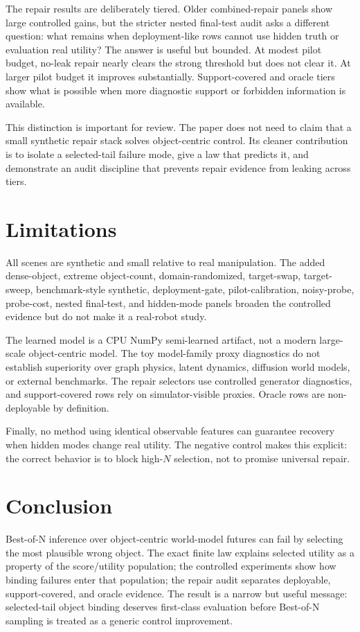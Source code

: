 \documentclass[10pt]{article}
\begin{document}
The repair results are deliberately tiered. Older combined-repair panels show large controlled gains, but the stricter nested final-test audit asks a different question: what remains when deployment-like rows cannot use hidden truth or evaluation real utility? The answer is useful but bounded. At modest pilot budget, no-leak repair nearly clears the strong threshold but does not clear it. At larger pilot budget it improves substantially. Support-covered and oracle tiers show what is possible when more diagnostic support or forbidden information is available.

This distinction is important for review. The paper does not need to claim that a small synthetic repair stack solves object-centric control. Its cleaner contribution is to isolate a selected-tail failure mode, give a law that predicts it, and demonstrate an audit discipline that prevents repair evidence from leaking across tiers.

\section{Limitations}

All scenes are synthetic and small relative to real manipulation. The added dense-object, extreme object-count, domain-randomized, target-swap, target-sweep, benchmark-style synthetic, deployment-gate, pilot-calibration, noisy-probe, probe-cost, nested final-test, and hidden-mode panels broaden the controlled evidence but do not make it a real-robot study.

The learned model is a CPU NumPy semi-learned artifact, not a modern large-scale object-centric model. The toy model-family proxy diagnostics do not establish superiority over graph physics, latent dynamics, diffusion world models, or external benchmarks. The repair selectors use controlled generator diagnostics, and support-covered rows rely on simulator-visible proxies. Oracle rows are non-deployable by definition.

Finally, no method using identical observable features can guarantee recovery when hidden modes change real utility. The negative control makes this explicit: the correct behavior is to block high-$N$ selection, not to promise universal repair.

\section{Conclusion}

Best-of-N inference over object-centric world-model futures can fail by selecting the most plausible wrong object. The exact finite law explains selected utility as a property of the score/utility population; the controlled experiments show how binding failures enter that population; the repair audit separates deployable, support-covered, and oracle evidence. The result is a narrow but useful message: selected-tail object binding deserves first-class evaluation before Best-of-N sampling is treated as a generic control improvement.
\end{document}
